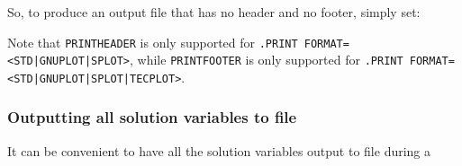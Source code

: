 \noindent So, to produce an output file that has no header and no footer, simply set:

Note that \texttt{PRINTHEADER} is only supported for \texttt{.PRINT FORMAT=<STD|GNUPLOT|SPLOT>},
while \texttt{PRINTFOOTER} is only supported for \texttt{.PRINT FORMAT=<STD|GNUPLOT|SPLOT|TECPLOT>}.

\subsubsection{Outputting all solution variables to file}

It can be convenient to have all the solution variables output to file during a
